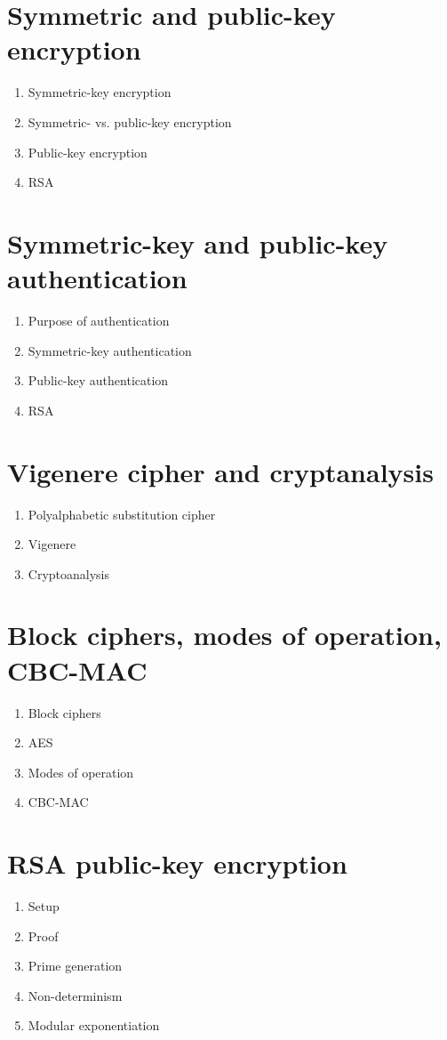\documentclass{article}
\begin{document}
\section{Symmetric and public-key encryption}
\begin{enumerate}
\item Symmetric-key encryption
\item Symmetric- vs. public-key encryption
\item Public-key encryption
\item RSA
\end{enumerate}
\clearpage

\section{Symmetric-key and public-key authentication}
\begin{enumerate}
\item Purpose of authentication
\item Symmetric-key authentication
\item Public-key authentication
\item RSA
\end{enumerate}
\clearpage

\section{Vigenere cipher and cryptanalysis}
\begin{enumerate}
\item Polyalphabetic substitution cipher
\item Vigenere
\item Cryptoanalysis
\end{enumerate}
\clearpage

\section{Block ciphers, modes of operation, CBC-MAC}
\begin{enumerate}
\item Block ciphers
\item AES
\item Modes of operation
\item CBC-MAC
\end{enumerate}
\clearpage

\section{RSA public-key encryption}
\begin{enumerate}
\item Setup
\item Proof
\item Prime generation
\item Non-determinism
\item Modular exponentiation
\end{enumerate}
\clearpage
\end{document}
